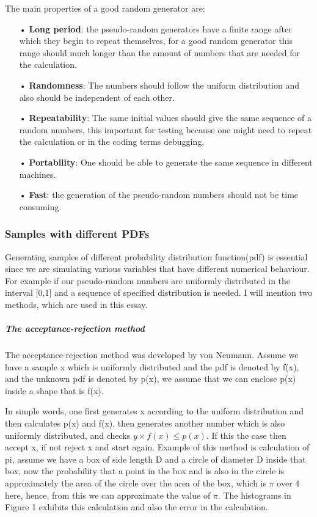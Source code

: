 \documentclass[12pt,a4paper]{article}
\begin{document}
The main properties of a good random generator are:

\begin{itemize}
\item[•]\textbf{Long period}: the pseudo-random generators have a finite range after which they begin to repeat themselves, for a good random generator this range should much longer than the amount of numbers that are needed for the calculation. 

\item[•]\textbf{Randomness}: The numbers should follow the uniform distribution and also should be independent of each other. 

\item[•]\textbf{Repeatability}: The same initial values should give the same sequence of a random numbers, this important for testing because one might need to repeat the calculation or in the coding terms debugging.

\item[•]\textbf{Portability}: One should be able to generate the same sequence in different machines. 

\item[•]\textbf{Fast}: the generation of the pseudo-random numbers should not be time consuming.    
\end{itemize}



\subsubsection{Samples with different PDFs}
Generating samples of different probability distribution function(pdf) is essential since we are simulating various variables that have different numerical behaviour. For example if our pseudo-random numbers are uniformly distributed in the interval [0,1] and a sequence of specified distribution is needed. I will mention two methods, which are used in this essay. 

\subparagraph{The acceptance-rejection method}
The acceptance-rejection method was developed by von Neumann. Assume we have a sample x which is uniformly distributed and the pdf is denoted by f(x), and the unknown pdf is denoted by p(x), we assume that we can enclose p(x) inside a shape that is f(x).

In simple words, one first generates x according to the uniform distribution and then calculates p(x) and f(x), then generates another number which is also uniformly distributed, and checks  $y \times f(x) \leq p(x)$. If this the case then accept x, if not reject x and start again. Example of this method is calculation of pi, assume we have a box of side length D and a circle of diameter D inside that box, now the probability that a point in the box and is also in the circle is approximately the area of the circle over the area of the box, which is $\pi$ over 4 here, hence, from this we can approximate the value of $\pi$. The histograms in Figure 1 exhibits this calculation and also the error in the calculation. 
\end{document}
